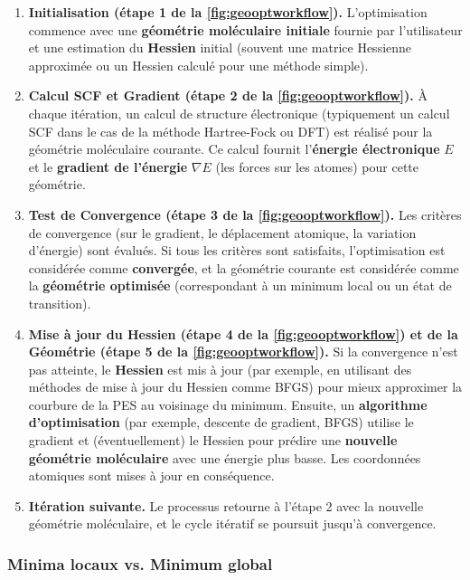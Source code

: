 \documentclass[12pt,a4paper]{article} %
\numberwithin{equation}{section} %
\numberwithin{figure}{section} %
\numberwithin{table}{section} %
\begin{document}
\begin{enumerate}
 \item \textbf{Initialisation (étape 1 de la \autoref{fig:geooptworkflow}).} L'optimisation commence avec une \textbf{géométrie moléculaire initiale} fournie par l'utilisateur et une estimation du \textbf{Hessien} initial (souvent une matrice Hessienne approximée ou un Hessien calculé pour une méthode simple).
 
 \item \textbf{Calcul SCF et Gradient (étape 2 de la \autoref{fig:geooptworkflow}).} À chaque itération, un calcul de structure électronique (typiquement un calcul SCF dans le cas de la méthode Hartree-Fock ou DFT) est réalisé pour la géométrie moléculaire courante. Ce calcul fournit l'\textbf{énergie électronique} $E$ et le \textbf{gradient de l'énergie} $\nabla E$ (les forces sur les atomes) pour cette géométrie.
 
 \item \textbf{Test de Convergence (étape 3 de la \autoref{fig:geooptworkflow}).} Les critères de convergence (sur le gradient, le déplacement atomique, la variation d'énergie) sont évalués. Si tous les critères sont satisfaits, l'optimisation est considérée comme \textbf{convergée}, et la géométrie courante est considérée comme la \textbf{géométrie optimisée} (correspondant à un minimum local ou un état de transition).
 
 \item \textbf{Mise à jour du Hessien (étape 4 de la \autoref{fig:geooptworkflow}) et de la Géométrie (étape 5 de la \autoref{fig:geooptworkflow}).} Si la convergence n'est pas atteinte, le \textbf{Hessien} est mis à jour (par exemple, en utilisant des méthodes de mise à jour du Hessien comme BFGS) pour mieux approximer la courbure de la PES au voisinage du minimum. Ensuite, un \textbf{algorithme d'optimisation} (par exemple, descente de gradient, BFGS) utilise le gradient et (éventuellement) le Hessien pour prédire une \textbf{nouvelle géométrie moléculaire} avec une énergie plus basse. Les coordonnées atomiques sont mises à jour en conséquence.
 
 \item \textbf{Itération suivante.} Le processus retourne à l'étape 2 avec la nouvelle géométrie moléculaire, et le cycle itératif se poursuit jusqu'à convergence.

\end{enumerate}

\subsubsection{Minima locaux vs. Minimum global}
\end{document}
